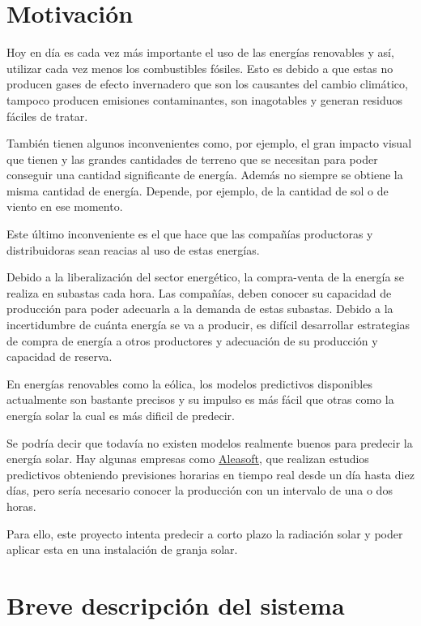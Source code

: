 \section{Motivación}
\label{makereference1.1}

Hoy en día es cada vez más importante el uso de las energías renovables y así, utilizar cada vez menos los combustibles fósiles. Esto es debido a que estas no producen gases de efecto invernadero que son los causantes del cambio climático, tampoco producen emisiones contaminantes, son inagotables y generan residuos fáciles de tratar.

También tienen algunos inconvenientes como, por ejemplo, el gran impacto visual que tienen y las grandes cantidades de terreno que se necesitan para poder conseguir una cantidad significante de energía. Además no siempre se obtiene la misma cantidad de energía. Depende, por ejemplo, de la cantidad de sol o de viento en ese momento.

Este último inconveniente es el que hace que las compañías productoras y distribuidoras sean reacias al uso de estas energías.

Debido a la liberalización del sector energético, la compra-venta de la energía se realiza en subastas cada hora. Las compañías, deben conocer su capacidad de producción para poder adecuarla a la demanda de estas subastas. Debido a la incertidumbre de cuánta energía se va a producir, es difícil desarrollar estrategias de compra de energía a otros productores y adecuación de su producción y capacidad de reserva.

En energías renovables como la eólica, los modelos predictivos disponibles actualmente son bastante precisos y su impulso es más fácil que otras como la energía solar la cual es más dificil de predecir.

Se podría decir que todavía no existen modelos realmente buenos para predecir la energía solar. Hay algunas empresas como \href{https://aleasoft.com/es/}{Aleasoft}, que realizan estudios predictivos obteniendo previsiones horarias en tiempo real desde un día hasta diez días, pero sería necesario conocer la producción con un intervalo de una o dos horas.

Para ello, este proyecto intenta predecir a corto plazo la radiación solar y poder aplicar esta en una instalación de granja solar.

\section{Breve descripción del sistema}
\label{makereference1.2}

